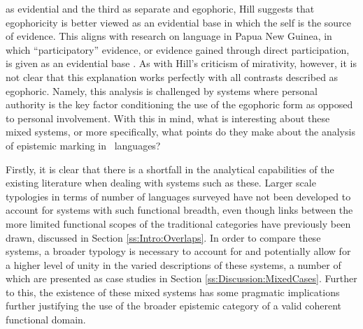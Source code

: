 as evidential and the third as separate and egophoric, Hill suggests that egophoricity is better viewed as an evidential base in which the self is the source of evidence. This aligns with research on language in Papua New Guinea, in which ``participatory'' evidence, or evidence gained through direct participation, is given as an evidential base \cite{SanRoque2012}. As with Hill's criticism of mirativity, however, it is not clear that this explanation works perfectly with all contrasts described as egophoric. Namely, this analysis is challenged by systems where personal authority is the key factor conditioning the use of the egophoric form as opposed to personal involvement. With this in mind, what is interesting about these mixed systems, or more specifically, what points do they make about the analysis of epistemic marking in \lfam\ languages?

Firstly, it is clear that there is a shortfall in the analytical capabilities of the existing literature when dealing with systems such as these. Larger scale typologies in terms of number of languages surveyed have not been developed to account for systems with such functional breadth, even though links between the more limited functional scopes of the traditional categories have previously been drawn, discussed in Section \ref{ss:Intro:Overlaps}. In order to compare these systems, a broader typology is necessary to account for and potentially allow for a higher level of unity in the varied descriptions of these systems, a number of which are presented as case studies in Section \ref{ss:Discussion:MixedCases}. Further to this, the existence of these mixed systems has some pragmatic implications further justifying the use of the broader epistemic category of a valid coherent functional domain.

